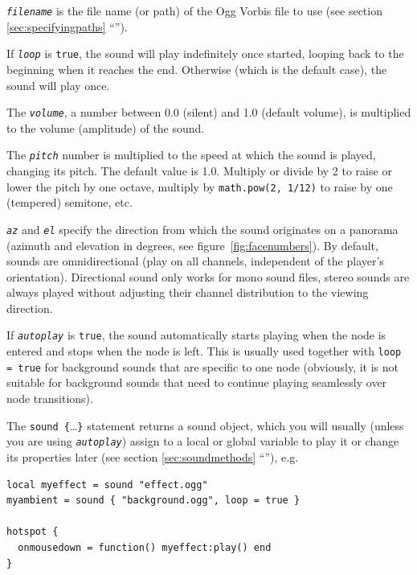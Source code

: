 \documentclass[
	a4paper,
	pagesize,
	10pt,
	oneside,
	idxtotoc,
	bibtotoc,
	BCOR10mm,
	DIV10
]{scrartcl} %
\newcommand{\luaparam}[1]{\texttt{\textit{#1}}}
\newcommand{\secref}[1]{\ref{sec:#1} “\nameref{sec:#1}”}
\begin{document}
\luaparam{filename} is the file name (or path) of the Ogg Vorbis file to use (see section \secref{specifyingpaths}).

If \luaparam{loop} is \texttt{true}, the sound will play indefinitely once started, looping back to the beginning when it reaches the end. Otherwise (which is the default case), the sound will play once.

The \luaparam{volume}, a number between 0.0 (silent) and 1.0 (default volume), is multiplied to the volume (amplitude) of the sound.

The \luaparam{pitch} number is multiplied to the speed at which the sound is played, changing its pitch. The default value is 1.0. Multiply or divide by 2 to raise or lower the pitch by one octave, multiply by \texttt{math.pow(2, 1/12)} to raise by one (tempered) semitone, etc.

\luaparam{az} and \luaparam{el} specify the direction from which the sound originates on a panorama (azimuth and elevation in degrees, see figure~\ref{fig:facenumbers}). By default, sounds are omnidirectional (play on all channels, independent of the player’s orientation). Directional sound only works for mono sound files, stereo sounds are always played without adjusting their channel distribution to the viewing direction.

If \luaparam{autoplay} is \texttt{true}, the sound automatically starts playing when the node is entered and stops when the node is left. This is usually used together with \texttt{loop = true} for background sounds that are specific to one node (obviously, it is not suitable for background sounds that need to continue playing seamlessly over node transitions).

The \verb|sound {|…\verb|}| statement returns a sound object, which you will usually (unless you are using \luaparam{autoplay}) assign to a local or global variable to play it or change its properties later (see section \secref{soundmethods}), e.g.
\begin{Verbatim}[frame=single, framesep=1ex, xleftmargin=0.1\textwidth, xrightmargin=0.1\textwidth, commandchars=\\^\$]
local myeffect = sound "effect.ogg"
myambient = sound { "background.ogg", loop = true }

hotspot {
  onmousedown = function() myeffect:play() end
}
\end{Verbatim}
\end{document}
